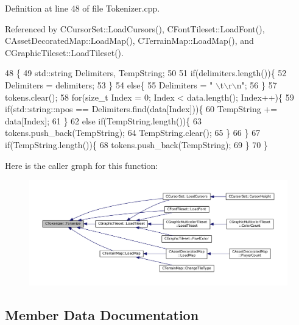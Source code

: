 Definition at line 48 of file Tokenizer.\+cpp.



Referenced by C\+Cursor\+Set\+::\+Load\+Cursors(), C\+Font\+Tileset\+::\+Load\+Font(), C\+Asset\+Decorated\+Map\+::\+Load\+Map(), C\+Terrain\+Map\+::\+Load\+Map(), and C\+Graphic\+Tileset\+::\+Load\+Tileset().


\begin{DoxyCode}
48                                                                                                           \{
49     std::string Delimiters, TempString;
50     
51     \textcolor{keywordflow}{if}(delimiters.length())\{
52         Delimiters = delimiters;
53     \}
54     \textcolor{keywordflow}{else}\{
55         Delimiters = \textcolor{stringliteral}{" \(\backslash\)t\(\backslash\)r\(\backslash\)n"};
56     \}
57     tokens.clear();
58     \textcolor{keywordflow}{for}(\textcolor{keywordtype}{size\_t} Index = 0; Index < data.length(); Index++)\{
59         \textcolor{keywordflow}{if}(std::string::npos == Delimiters.find(data[Index]))\{
60             TempString += data[Index];
61         \}
62         \textcolor{keywordflow}{else} \textcolor{keywordflow}{if}(TempString.length())\{
63             tokens.push\_back(TempString);
64             TempString.clear();
65         \}
66     \}
67     \textcolor{keywordflow}{if}(TempString.length())\{
68         tokens.push\_back(TempString);
69     \}
70 \}
\end{DoxyCode}
Here is the caller graph for this function\+:\nopagebreak
\begin{figure}[H]
\begin{center}
\leavevmode
\includegraphics[width=350pt]{classCTokenizer_a7477f6849a3d0a5154879d8622e4012c_icgraph}
\end{center}
\end{figure}


\subsection{Member Data Documentation}
\hypertarget{classCTokenizer_aaa6faab432000d3f942a0c14fc09f60b}{}\label{classCTokenizer_aaa6faab432000d3f942a0c14fc09f60b} 
